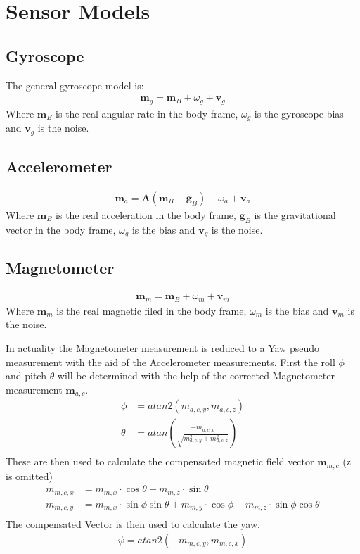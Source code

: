 \documentclass[10pt,a4paper]{article}
\newcommand{\M}[1]{\mathbf{#1}}
\newcommand{\V}[1]{\mathbf{#1}}
\begin{document}
\section{Sensor Models}

\subsection{Gyroscope}
The general gyroscope model is:
\begin{align}
  \V m_g = \V m_B + \omega_g + \V v_g
\end{align}
Where $\V m_B$ is the real angular rate in the body frame, $\omega_g$ is the gyroscope bias and $\V v_g$ is the noise.
\subsection{Accelerometer}
\begin{align}
  \V m_a =  \M A (\V m_B - \V g_B) + \omega_a + \V v_a
\end{align}
Where $\V m_B$ is the real acceleration in the body frame, $\V g_B$ is the gravitational vector in the body frame, $\omega_g$ is the bias and $\V v_g$ is the noise.

\subsection{Magnetometer}
\begin{align}
  \V m_m = \V m_B + \omega_m + \V v_m
\end{align}
Where $\V m_m$ is the real magnetic filed in the body frame, $\omega_m$ is the bias and $\V v_m$ is the noise.

In actuality the Magnetometer measurement is reduced to a Yaw pseudo measurement with the aid of the Accelerometer measurements.
First the roll $\phi$ and pitch $\theta$ will be determined with the help of the corrected Magnetometer measurement $\V m_{a,c}$.
\begin{align}
  \phi &= atan2(m_{a,c,y}, m_{a,c,z}) \\ 
  \theta &= atan\left (\frac {- m_{a,c,x}}{\sqrt{m_{a,c,y}^2 + m_{a,c,z}^2}} \right) \\ 
\end{align}
These are then used to calculate the compensated magnetic field vector $\V m_{m,c}$ (z is omitted)
\begin{align}
  m_{m,c,x} &= m_{m,x} \cdot \cos {\theta} + m_{m,z} \cdot \sin {\theta} \\
  m_{m,c,y} &= m_{m,x} \cdot \sin {\phi} \sin {\theta} + m_{m,y} \cdot \cos {\phi} - m_{m,z} \cdot \sin {\phi} \cos {\theta}\\
\end{align}
The compensated Vector is then used to calculate the yaw.
\begin{align}
  \psi = atan2(- m_{m,c,y}, m_{m,c,x})
\end{align}
\end{document}
